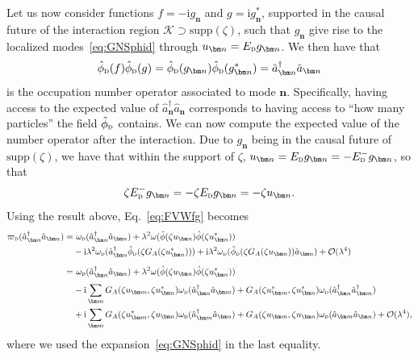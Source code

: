 \documentclass[letterpaper,12pt,titlepage,oneside,final]{book}
\newcommand{\ii}{\mathrm{i}}
\newcommand{\tc}[1]{\textsc{#1}}
\begin{document}
Let us now consider functions $f = -\ii g_{\bm n}$ and $g = \ii g_{\bm n}^*$, supported in the causal future of the interaction region $\mathcal{K} \supset \text{supp}(\zeta)$, such that $g_{\bm n}$ give rise to the localized modes~\eqref{eq:GNSphid} through $u_{\bm n} = E_\tc{d} g_{\bm n}$. We then have that
\begin{equation}
    \hat{\phi}_\tc{d}(f)\hat{\phi}_\tc{d}(g) = \hat{\phi}_\tc{d}(g_{\bm n})\hat{\phi}_\tc{d}(g_{\bm n}^*) = \hat{a}_{\bm n}^\dagger \hat{a}_{\bm n}
\end{equation}
is the occupation number operator associated to mode $\bm n$. Specifically, having access to the expected value of $\hat{a}_{\bm n}^\dagger \hat{a}_{\bm n}$ corresponds to having access to ``how many particles'' the field $\hat{\phi}_\tc{d}$ contains. We can now compute the expected value of the number operator after the interaction. Due to $g_{\bm n}$ being in the causal future of $\text{supp}(\zeta)$, we have that within the support of $\zeta$, $u_{\bm n} =  E_\tc{d}g_{\bm n} =- E_\tc{d}^-g_{\bm n}$, so that 
\begin{equation}\label{eq:Jesus}
    \zeta E_\tc{d}^-g_{\bm n} = -\zeta E_\tc{d}g_{\bm n} = -\zeta u_{\bm n}.
\end{equation}
Using the result above, Eq.~\eqref{eq:FVWfg} becomes
\begin{align}
    \varpi_{\tc{d}}(\hat{a}_{\bm n}^\dagger \hat{a}_{\bm n}) = &\,\,\omega_\tc{d}(\hat{a}_{\bm n}^\dagger \hat{a}_{\bm n}) + \lambda^2 \omega(\hat{\phi}(\zeta u_{\bm n})\hat{\phi}(\zeta u_{\bm n}^*)) \\
    &-\ii \lambda^2\omega_\tc{d}(\hat{a}_{\bm n}^\dagger\hat{\phi}_\tc{d}(\zeta G_A(\zeta u_{\bm n}^*))) + \ii \lambda^2\omega_\tc{d}(\hat{\phi}_\tc{d}(\zeta G_A(\zeta u_{\bm n}))\hat{a}_{\bm n}) + \mathcal{O}(\lambda^4)\\[2mm]
    =&\,\, \omega_\tc{d}(\hat{a}_{\bm n}^\dagger \hat{a}_{\bm n}) + \lambda^2 \omega(\hat{\phi}(\zeta u_{\bm n})\hat{\phi}(\zeta u_{\bm n}^*))\\[1mm]
    &- \ii  \sum_{\bm m} G_A(\zeta u_{\bm m},\zeta u_{\bm n}^*)\omega_\tc{d}(\hat{a}_{\bm n}^\dagger\hat{a}_{\bm m}) + G_A(\zeta u_{\bm m}^*,\zeta u_{\bm n}^*)\omega_\tc{d}(\hat{a}_{\bm n}^\dagger\hat{a}_{\bm m}^\dagger) 
    \\
    &+\ii \sum_{\bm m} G_A(\zeta u_{\bm m}^*,\zeta u_{\bm n})\omega_\tc{d}(\hat{a}_{\bm m}^\dagger\hat{a}_{\bm n}) + G_A(\zeta u_{\bm m},\zeta u_{\bm n})\omega_\tc{d}(\hat{a}_{\bm m}\hat{a}_{\bm n})
    + \mathcal{O}(\lambda^4),
\end{align}
where we used the expansion~\eqref{eq:GNSphid} in the last equality.
\end{document}
